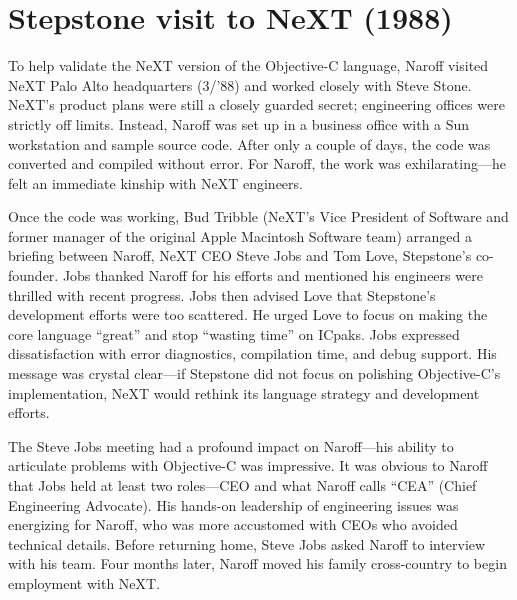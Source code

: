 \documentclass[acmsmall]{acmart}\settopmatter{}
\begin{document}
\section{Stepstone visit to NeXT (1988)}
\label{sec-stepstonetoNeXT1988}
To help validate the NeXT version of the Objective-C language, Naroff visited NeXT Palo Alto headquarters (3/'88) and worked closely with Steve Stone. NeXT's product plans were still a closely guarded secret; engineering offices were strictly off limits. Instead, Naroff was set up in a business office with a Sun workstation and sample source code. After only a couple of days, the code was converted and compiled without error. For Naroff, the work was exhilarating---he felt an immediate kinship with NeXT engineers.

Once the code was working, Bud Tribble (NeXT's Vice President of Software and former manager of the original Apple Macintosh Software team) arranged a briefing between Naroff, NeXT CEO Steve Jobs and Tom Love, Stepstone's co-founder. Jobs thanked Naroff for his efforts and mentioned his engineers were thrilled with recent progress. Jobs then advised Love that Stepstone's development efforts were too scattered. He urged Love to focus on making the core language ``great'' and stop ``wasting time'' on ICpaks. Jobs expressed dissatisfaction with error diagnostics, compilation time, and debug support. His message was crystal clear---if Stepstone did not focus on polishing Objective-C's implementation, NeXT would rethink its language strategy and development efforts.

The Steve Jobs meeting had a profound impact on Naroff---his ability to articulate problems with Objective-C was impressive. It was obvious to Naroff that Jobs held at least two roles---CEO and what Naroff calls ``CEA'' (Chief Engineering Advocate). His hands-on leadership of engineering issues was energizing for Naroff, who was more accustomed with CEOs who avoided technical details. Before returning home, Steve Jobs asked Naroff to interview with his team. Four months later, Naroff moved his family cross-country to begin employment with NeXT. 
\end{document}
